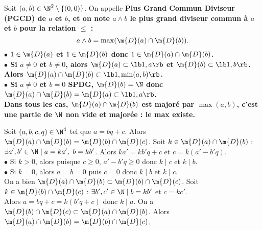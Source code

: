 \documentclass[11pt]{article}
\begin{document}
\begin{defi}{}{}
    Soit $(a,b)\in\N^2\setminus\{(0,0)\}$. On appelle \bf{Plus Grand Commun Diviseur} (PGCD) de $a$ et $b$, et on note $a\land b$ le plus grand diviseur commun à $a$ et $b$ pour la relation $\leq$ :
    \begin{equation*}
        a \land b = \max(\m{D}(a)\cap\m{D}(b)).
    \end{equation*}
    \tcblower
    $\bullet$ $1\in\m{D}(a)$ et $1\in\m{D}(b)$ donc $1\in\m{D}(a)\cap\m{D}(b)$.\\
    $\bullet$ Si $a\neq0$ et $b\neq0$, alors $\m{D}(a)\subset\lb1,a\rb$ et $\m{D}(b)\subset\lb1,b\rb$. Alors $\m{D}(a)\cap\m{D}(b)\subset\lb1,\min(a,b)\rb$.\\
    $\bullet$ Si $a\neq0$ et $b=0$ SPDG, $\m{D}(b)=\N$ donc $\m{D}(a)\cap\m{D}(b)=\m{D}(a)\subset\lb1,a\rb$.\\
    Dans tous les cas, $\m{D}(a)\cap\m{D}(b)$ est majoré par $\max(a,b)$, c'est une partie de $\N$ non vide et majorée : le max existe. 
\end{defi}

\begin{lemme}{}{}
    Soit $(a,b,c,q)\in\N^4$ tel que $a=bq+c$. Alors $\m{D}(a)\cap\m{D}(b)=\m{D}(b)\cap\m{D}(c)$.
    \tcblower
    Soit $k\in\m{D}(a)\cap\m{D}(b)$ : $\exists a',b'\in\N\mid a=ka', ~ b=kb'$. Alors $ka'=kb'q+c$ et $c=k(a'-b'q)$.\\
    $\bullet$ Si $k>0$, alors puisque $c\geq0$, $a'-b'q\geq0$ donc $k\mid c$ et $k\mid b$.\\
    $\bullet$ Si $k=0$, alors $a=b=0$ puis $c=0$ donc $k\mid b$ et $k\mid c$.\\
    On a bien $\m{D}(a)\cap\m{D}(b)\subset \m{D}(b)\cap\m{D}(c)$.\n
    Soit $k\in\m{D}(b)\cap\m{D}(c)$ : $\exists b',c'\in\N\mid b=kb'$ et $c=kc'$.\\
    Alors $a=bq+c=k(b'q+c)$ donc $k\mid a$. On a $\m{D}(b)\cap\m{D}(c)\subset\m{D}(a)\cap\m{D}(b)$.\n
    Alors $\m{D}(a)\cap\m{D}(b)=\m{D}(b)\cap\m{D}(c)$.
\end{lemme}
\end{document}
